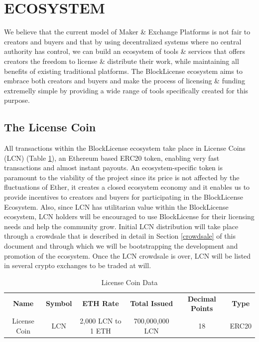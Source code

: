 \section{ECOSYSTEM} \label{ecosystem}

We believe that the current model of Maker \& Exchange Platforms is not fair to creators and buyers and that by using decentralized systems where no central authority has control, we can build an ecosystem of tools \& services that offers creators the freedom to license \& distribute their work, while maintaining all benefits of existing traditional platforms. The BlockLicense ecosystem aims to embrace both creators and buyers and make the process of licensing \& funding extremelly simple by providing a wide range of tools specifically created for this purpose.


\subsection{The License Coin}

All transactions within the BlockLicense ecosystem take place in License Coins (LCN) (Table \ref{table:lcn}), an Ethereum based ERC20 \cite{erc20} token, enabling very fast transactions and almost instant payouts. An ecosystem-specific token is paramount to the viability of the project since its price is not affected by the fluctuations of Ether, it creates a closed ecosystem economy and it enables us to provide incentives to creators and buyers for participating in the BlockLicense Ecosystem. Also, since LCN has utilitarian value within the BlockLicense ecosystem, LCN holders will be encouraged to use BlockLicense for their licensing needs and help the community grow. Initial LCN distribution will take place through a crowdsale that is described in detail in Section \ref{crowdsale} of this document and through which we will be bootstrapping the development and promotion of the ecosystem. Once the LCN crowdsale is over, LCN will be listed in several crypto exchanges to be traded at will.

\begin{table}[t!]
\begin{center}
\begin{tabular}{c c c c c c}
& & \\ %
\toprule
\textbf{Name} & \textbf{Symbol}  & \textbf{ETH Rate} & \textbf{Total Issued}  & \textbf{Decimal Points} & \textbf{Type}\\
\midrule
 License Coin & LCN & 2,000 LCN to 1 ETH & 700,000,000 LCN & 18 & ERC20\\
\bottomrule
\end{tabular}
\end{center}
\caption{License Coin Data}
\label{table:lcn}
\end{table}

